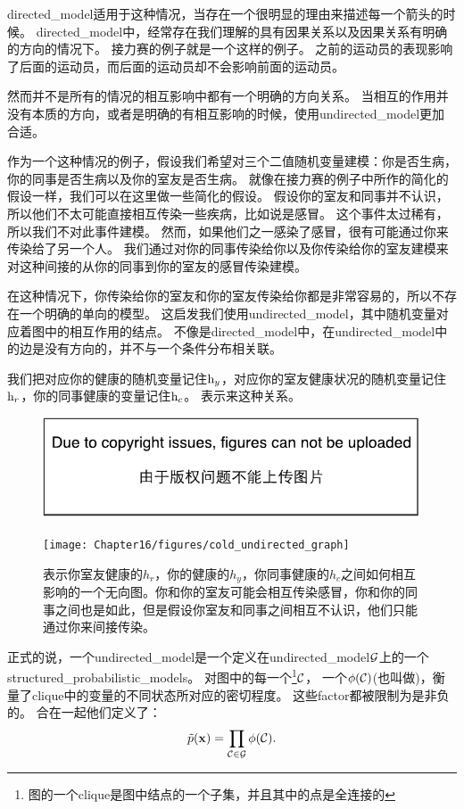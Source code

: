 \gls{directed_model}适用于这种情况，当存在一个很明显的理由来描述每一个箭头的时候。
\gls{directed_model}中，经常存在我们理解的具有因果关系以及因果关系有明确的方向的情况下。
接力赛的例子就是一个这样的例子。
之前的运动员的表现影响了后面的运动员，而后面的运动员却不会影响前面的运动员。


然而并不是所有的情况的相互影响中都有一个明确的方向关系。
当相互的作用并没有本质的方向，或者是明确的有相互影响的时候，使用\gls{undirected_model}更加合适。


作为一个这种情况的例子，假设我们希望对三个二值随机变量建模：你是否生病，你的同事是否生病以及你的室友是否生病。
就像在接力赛的例子中所作的简化的假设一样，我们可以在这里做一些简化的假设。
假设你的室友和同事并不认识，所以他们不太可能直接相互传染一些疾病，比如说是感冒。
这个事件太过稀有，所以我们不对此事件建模。
然而，如果他们之一感染了感冒，很有可能通过你来传染给了另一个人。
我们通过对你的同事传染给你以及你传染给你的室友建模来对这种间接的从你的同事到你的室友的感冒传染建模。


在这种情况下，你传染给你的室友和你的室友传染给你都是非常容易的，所以不存在一个明确的单向的模型。
这启发我们使用\gls{undirected_model}，其中随机变量对应着图中的相互作用的结点。
不像是\gls{directed_model}中，在\gls{undirected_model}中的边是没有方向的，并不与一个条件分布相关联。


我们把对应你的健康的随机变量记住$\mathrm{h}_y$，对应你的室友健康状况的随机变量记住$\mathrm{h}_r$，你的同事健康的变量记住$\mathrm{h}_c$。
表示来这种关系。

\begin{figure}[!htb]
\ifOpenSource
\centerline{\includegraphics{figure.pdf}}
\else
	\centerline{\texttt{[image: Chapter16/figures/cold\_undirected\_graph]}}	
\fi
	\caption{表示你室友健康的$h_r$，你的健康的$h_y$，你同事健康的$h_c$之间如何相互影响的一个无向图。你和你的室友可能会相互传染感冒，你和你的同事之间也是如此，但是假设你室友和同事之间相互不认识，他们只能通过你来间接传染。}
	\label{fig:cold_undirected_graph}
\end{figure}

正式的说，一个\gls{undirected_model}是一个定义在\gls{undirected_model}$\mathcal{G}$上的一个\gls{structured_probabilistic_models}。
对图中的每一个\footnote{图的一个\gls{clique}是图中结点的一个子集，并且其中的点是全连接的}$\mathcal{C}$，
一个$\phi(\mathcal{C})$(也叫做)，衡量了\gls{clique}中的变量的不同状态所对应的密切程度。
这些\gls{factor}都被限制为是非负的。
合在一起他们定义了：
\begin{align}
\label{eqn:163}
\tilde{p}(\mathbf{x}) = \prod_{\mathcal{C}\in\mathcal{G}} \phi(\mathcal{C}).
\end{align}


